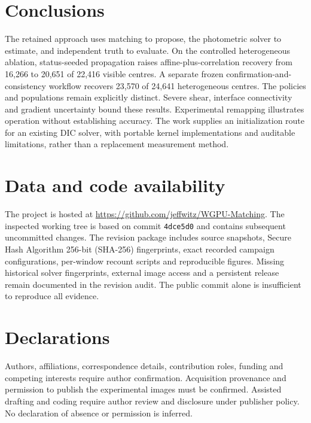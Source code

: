 \documentclass[11pt,a4paper]{article}
\begin{document}
\section{Conclusions}
The retained approach uses matching to propose, the photometric solver to estimate, and independent truth to evaluate. On the controlled heterogeneous ablation, status-seeded propagation raises affine-plus-correlation recovery from 16,266 to 20,651 of 22,416 visible centres. A separate frozen confirmation-and-consistency workflow recovers 23,570 of 24,641 heterogeneous centres. The policies and populations remain explicitly distinct. Severe shear, interface connectivity and gradient uncertainty bound these results. Experimental remapping illustrates operation without establishing accuracy. The work supplies an initialization route for an existing DIC solver, with portable kernel implementations and auditable limitations, rather than a replacement measurement method.

\appendix

\section*{Data and code availability}
The project is hosted at \url{https://github.com/jeffwitz/WGPU-Matching}. The inspected working tree is based on commit \texttt{4dce5d0} and contains subsequent uncommitted changes. The revision package includes source snapshots, Secure Hash Algorithm 256-bit (SHA-256) fingerprints, exact recorded campaign configurations, per-window recount scripts and reproducible figures. Missing historical solver fingerprints, external image access and a persistent release remain documented in the revision audit. The public commit alone is insufficient to reproduce all evidence.
\section*{Declarations}
Authors, affiliations, correspondence details, contribution roles, funding and competing interests require author confirmation. Acquisition provenance and permission to publish the experimental images must be confirmed. Assisted drafting and coding require author review and disclosure under publisher policy. No declaration of absence or permission is inferred.

\end{document}
